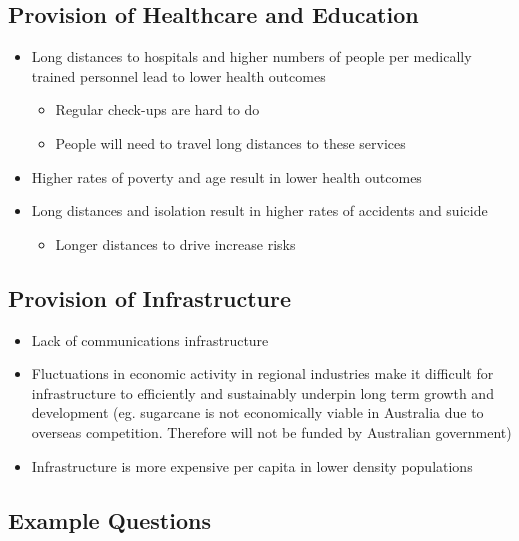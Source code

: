	\subsection{Provision of Healthcare and Education}
		
		\begin{itemize}
			\item Long distances to hospitals and higher numbers of people per medically trained personnel lead to lower health outcomes
				\begin{itemize}
					\item Regular check-ups are hard to do
					\item People will need to travel long distances to these services
				\end{itemize}
			\item Higher rates of poverty and age result in lower health outcomes
			\item Long distances and isolation result in higher rates of accidents and suicide
				\begin{itemize}
					\item Longer distances to drive increase risks
				\end{itemize}
		\end{itemize}

	\subsection{Provision of Infrastructure}
	
		\begin{itemize}
			\item Lack of communications infrastructure
			\item Fluctuations in economic activity in regional industries make it difficult for infrastructure to efficiently and sustainably underpin long term growth and development (eg. sugarcane is not economically viable in Australia due to overseas competition. Therefore will not be funded by Australian government)
			\item Infrastructure is more expensive per capita in lower density populations
		\end{itemize}

	\subsection{Example Questions}
	
